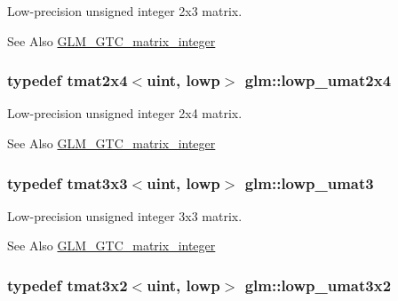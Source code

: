 Low-\/precision unsigned integer 2x3 matrix. \begin{DoxySeeAlso}{See Also}
\hyperlink{group__gtc__matrix__integer}{G\-L\-M\-\_\-\-G\-T\-C\-\_\-matrix\-\_\-integer} 
\end{DoxySeeAlso}
\hypertarget{group__gtc__matrix__integer_gad5e8f08c103d5dd33767e31938357aa6}{
\subsubsection[{lowp\-\_\-umat2x4}]{\setlength{\rightskip}{0pt plus 5cm}typedef tmat2x4$<$uint, lowp$>$ {\bf glm\-::lowp\-\_\-umat2x4}}}\label{group__gtc__matrix__integer_gad5e8f08c103d5dd33767e31938357aa6}
Low-\/precision unsigned integer 2x4 matrix. \begin{DoxySeeAlso}{See Also}
\hyperlink{group__gtc__matrix__integer}{G\-L\-M\-\_\-\-G\-T\-C\-\_\-matrix\-\_\-integer} 
\end{DoxySeeAlso}
\hypertarget{group__gtc__matrix__integer_ga71b66cc4f5e2d30b64ec99425562a6b6}{
\subsubsection[{lowp\-\_\-umat3}]{\setlength{\rightskip}{0pt plus 5cm}typedef tmat3x3$<$uint, lowp$>$ {\bf glm\-::lowp\-\_\-umat3}}}\label{group__gtc__matrix__integer_ga71b66cc4f5e2d30b64ec99425562a6b6}
Low-\/precision unsigned integer 3x3 matrix. \begin{DoxySeeAlso}{See Also}
\hyperlink{group__gtc__matrix__integer}{G\-L\-M\-\_\-\-G\-T\-C\-\_\-matrix\-\_\-integer} 
\end{DoxySeeAlso}
\hypertarget{group__gtc__matrix__integer_ga3ea8482ddaa10befe8dc2d681d86bb59}{
\subsubsection[{lowp\-\_\-umat3x2}]{\setlength{\rightskip}{0pt plus 5cm}typedef tmat3x2$<$uint, lowp$>$ {\bf glm\-::lowp\-\_\-umat3x2}}}\label{group__gtc__matrix__integer_ga3ea8482ddaa10befe8dc2d681d86bb59}
